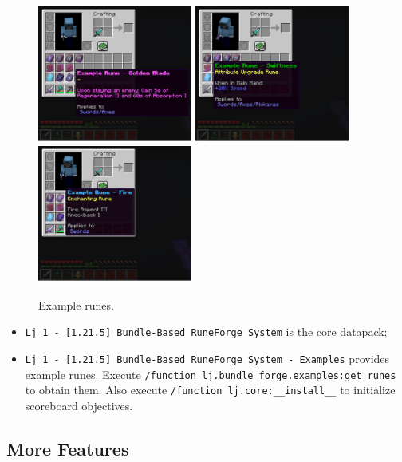 \documentclass[11pt]{article}
\begin{document}
\begin{figure}[htbp]
  \centering
  \includegraphics[width=2in]{Screenshot from 2025-04-04 21-55-31.png}
  \includegraphics[width=2in]{Screenshot from 2025-04-04 21-55-36.png}
  \includegraphics[width=2in]{Screenshot from 2025-04-04 21-55-42.png}
  \caption{Example runes.} %
\end{figure}

\begin{itemize}
  \item \colorbox{black!20}{\small\tt Lj\_1 - [1.21.5] Bundle-Based RuneForge System} is the core datapack;
  \item \colorbox{black!20}{\small\tt Lj\_1 - [1.21.5] Bundle-Based RuneForge System - Examples} provides\\example runes. Execute \colorbox{black!20}{\small\tt/function lj.bundle\_forge.examples:get\_runes} to obtain them. Also execute \colorbox{black!20}{\small\tt/function lj.core:\_\_install\_\_} to initialize scoreboard objectives.
\end{itemize}

\subsection{More Features}
\end{document}
